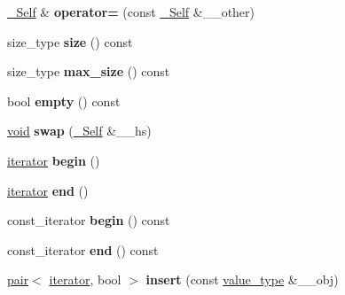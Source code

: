 \begin{DoxyCompactItemize}
\item 
\mbox{\label{classunordered__map_a5fd41a4bff1ec7ff12346b80b0b56e20}} 
\hyperlink{classunordered__map}{\+\_\+\+Self} \& {\bfseries operator=} (const \hyperlink{classunordered__map}{\+\_\+\+Self} \&\+\_\+\+\_\+other)
\item 
\mbox{\label{classunordered__map_a7a33a3d5cc565bd58d06f22bfc2025a6}} 
size\+\_\+type {\bfseries size} () const
\item 
\mbox{\label{classunordered__map_aba50487d91c8c1dc8b28739484096e61}} 
size\+\_\+type {\bfseries max\+\_\+size} () const
\item 
\mbox{\label{classunordered__map_a691aea0936dbeda0d862d2e4a5e737f2}} 
bool {\bfseries empty} () const
\item 
\mbox{\label{classunordered__map_aa80294b7394b71d63862958386f87cda}} 
\hyperlink{interfacevoid}{void} {\bfseries swap} (\hyperlink{classunordered__map}{\+\_\+\+Self} \&\+\_\+\+\_\+hs)
\item 
\mbox{\label{classunordered__map_a305649152f69435f774e9837011dc78f}} 
\hyperlink{structiterator}{iterator} {\bfseries begin} ()
\item 
\mbox{\label{classunordered__map_a048539a63bab5037060fe7a956fa7439}} 
\hyperlink{structiterator}{iterator} {\bfseries end} ()
\item 
\mbox{\label{classunordered__map_a8fa43a145bfe6cf416776777edf8a686}} 
const\+\_\+iterator {\bfseries begin} () const
\item 
\mbox{\label{classunordered__map_a1322d7382c05f67e13e1154e2aede581}} 
const\+\_\+iterator {\bfseries end} () const
\item 
\mbox{\label{classunordered__map_a2da00df7aebb002fa751cd609e4afc22}} 
\hyperlink{structpair}{pair}$<$ \hyperlink{structiterator}{iterator}, bool $>$ {\bfseries insert} (const \hyperlink{structpair}{value\+\_\+type} \&\+\_\+\+\_\+obj)
\item 

\end{DoxyCompactItemize}
